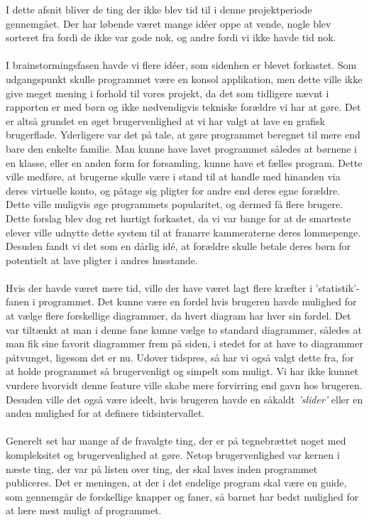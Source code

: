 I dette afsnit bliver de ting der ikke blev tid til i denne projektperiode gennemgået. Der har løbende været mange idéer oppe at vende, nogle blev sorteret fra fordi de ikke var gode nok, og andre fordi vi ikke havde tid nok. \\
\\
I brainstormingsfasen havde vi flere idéer, som sidenhen er blevet forkastet. Som udgangspunkt skulle programmet være en konsol applikation, men dette ville ikke give meget mening i forhold til vores projekt, da det som tidligere nævnt i rapporten er med børn og ikke nødvendigvis tekniske forældre vi har at gøre. Det er altså grundet en øget brugervenlighed at vi har valgt at lave en grafisk brugerflade. Yderligere var det på tale, at gøre programmet beregnet til mere end bare den enkelte familie. Man kunne have lavet programmet således at børnene i en klasse, eller en anden form for forsamling, kunne have et fælles program. Dette ville medføre, at brugerne skulle være i stand til at handle med hinanden via deres virtuelle konto, og påtage sig pligter for andre end deres egne forældre. Dette ville muligvis øge programmets popularitet, og dermed få flere brugere. Dette forslag blev dog ret hurtigt forkastet, da vi var bange for at de smarteste elever ville udnytte dette system til at franarre kammeraterne deres lommepenge. Desuden fandt vi det som en dårlig idé, at forældre skulle betale deres børn for potentielt at lave pligter i andres husstande.\\
\\
Hvis der havde været mere tid, ville der have været lagt flere kræfter i 'statistik'-fanen i programmet. Det kunne være en fordel hvis brugeren havde mulighed for at vælge flere forskellige diagrammer, da hvert diagram har hver sin fordel. Det var tiltænkt at man i denne fane kunne vælge to standard diagrammer, således at man fik sine favorit diagrammer frem på siden, i stedet for at have to diagrammer påtvunget, ligesom det er nu. Udover tidspres, så har vi også valgt dette fra, for at holde programmet så brugervenligt og simpelt som muligt. Vi har ikke kunnet vurdere hvorvidt denne feature ville skabe mere forvirring end gavn hos brugeren. Desuden ville det også være ideelt, hvis brugeren havde en såkaldt \textit{'slider'} eller en anden mulighed for at definere tidsintervallet.\\
\\
Generelt set har mange af de fravalgte ting, der er på tegnebrættet noget med kompleksitet og brugervenlighed at gøre. Netop brugervenlighed var kernen i næste ting, der var på listen over ting, der skal laves inden programmet publiceres. Det er meningen, at der i det endelige program skal være en guide, som gennemgår de forskellige knapper og faner, så barnet har bedst mulighed for at lære mest muligt af programmet.\\

